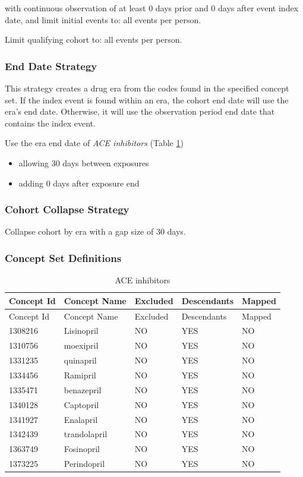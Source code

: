 \documentclass[10.5pt]{book}
\providecommand{\tightlist}{%
  \setlength{\itemsep}{0pt}\setlength{\parskip}{0pt}}
\theoremstyle{definition}
\theoremstyle{definition}
\theoremstyle{definition}
\theoremstyle{remark}
\begin{document}
with continuous observation of at least 0 days prior and 0 days after
event index date, and limit initial events to: all events per person.

Limit qualifying cohort to: all events per person.

\subsubsection*{End Date Strategy}\label{end-date-strategy-6}

This strategy creates a drug era from the codes found in the specified
concept set. If the index event is found within an era, the cohort end
date will use the era's end date. Otherwise, it will use the observation
period end date that contains the index event.

Use the era end date of \emph{ACE inhibitors} (Table
\ref{tab:ACEiUseACE})

\begin{itemize}
\tightlist
\item
  allowing 30 days between exposures
\item
  adding 0 days after exposure end
\end{itemize}

\subsubsection*{Cohort Collapse
Strategy}\label{cohort-collapse-strategy-6}

Collapse cohort by era with a gap size of 30 days.

\subsubsection*{Concept Set
Definitions}\label{concept-set-definitions-6}

\begin{longtable}[]{@{}lllll@{}}
\caption{\label{tab:ACEiUseACE} ACE inhibitors}\tabularnewline
\toprule
Concept Id & Concept Name & Excluded & Descendants &
Mapped\tabularnewline
\midrule
\endfirsthead
\toprule
Concept Id & Concept Name & Excluded & Descendants &
Mapped\tabularnewline
\midrule
\endhead
1308216 & Lisinopril & NO & YES & NO\tabularnewline
1310756 & moexipril & NO & YES & NO\tabularnewline
1331235 & quinapril & NO & YES & NO\tabularnewline
1334456 & Ramipril & NO & YES & NO\tabularnewline
1335471 & benazepril & NO & YES & NO\tabularnewline
1340128 & Captopril & NO & YES & NO\tabularnewline
1341927 & Enalapril & NO & YES & NO\tabularnewline
1342439 & trandolapril & NO & YES & NO\tabularnewline
1363749 & Fosinopril & NO & YES & NO\tabularnewline
1373225 & Perindopril & NO & YES & NO\tabularnewline
\bottomrule
\end{longtable}
\end{document}
